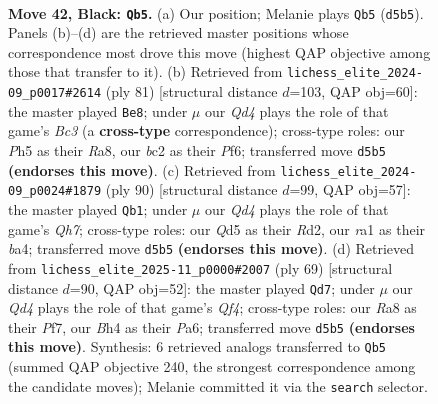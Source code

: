 \documentclass[11pt]{article}
\begin{document}
\begin{figure}[p]
\label{fig:thought-m81}
\end{figure}

\clearpage

\begin{figure}[p]\centering
\begin{subfigure}{0.46\textwidth}\centering
\resizebox{\linewidth}{!}{%
\newchessgame
\chessboard[
  setfen={r1b4k/ppp2pp1/5n2/3q3p/1B3P1b/1P2Q2P/P1B3P1/R5K1 b - - 0 42},
  showmover=false,
  pgfstyle=straightmove, color=movearrow, markmove={d5-b5}
]}
\caption{}
\end{subfigure}\hfill
\begin{subfigure}{0.46\textwidth}\centering
\resizebox{\linewidth}{!}{%
\newchessgame
\chessboard[
  setfen={r4b1k/2q3p1/2b2p1p/p3p3/P1P5/2B1P2P/2QN1PP1/R5K1 b - - 10 41},
  showmover=false,
  pgfstyle=straightmove, color=movearrow, markmove={c6-e8}
]}
\caption{}
\end{subfigure}
\\[4pt]
\begin{subfigure}{0.46\textwidth}\centering
\resizebox{\linewidth}{!}{%
\newchessgame
\chessboard[
  setfen={5r2/1q1kbp1Q/4p3/3pP3/b2B3P/p4N2/1p1R1PPK/8 w - - 0 46},
  showmover=false,
  pgfstyle=straightmove, color=movearrow, markmove={h7-b1}
]}
\caption{}
\end{subfigure}\hfill
\begin{subfigure}{0.46\textwidth}\centering
\resizebox{\linewidth}{!}{%
\newchessgame
\chessboard[
  setfen={6k1/5pp1/p4n2/P4q1p/2pP4/2NbP1PP/1r3PB1/2R1Q1K1 b - - 4 35},
  showmover=false,
  pgfstyle=straightmove, color=movearrow, markmove={f5-d7}
]}
\caption{}
\end{subfigure}
\caption{\textbf{Move 42, Black: \texttt{Qb5}.} (a) Our position; Melanie plays \texttt{Qb5} (\texttt{d5b5}). Panels (b)--(d) are the retrieved master positions whose correspondence most drove this move (highest QAP objective among those that transfer to it). (b) Retrieved from \texttt{lichess\_elite\_2024-09\_p0017\#2614} (ply 81) [structural distance $d$=103, QAP obj=60]: the master played \texttt{Be8}; under $\mu$ our \emph{Qd4} plays the role of that game's \emph{Bc3} (a \textbf{cross-type} correspondence); cross-type roles: our \emph{P}h5 as their \emph{R}a8, our \emph{b}c2 as their \emph{P}f6; transferred move \texttt{d5b5} \textbf{(endorses this move)}. (c) Retrieved from \texttt{lichess\_elite\_2024-09\_p0024\#1879} (ply 90) [structural distance $d$=99, QAP obj=57]: the master played \texttt{Qb1}; under $\mu$ our \emph{Qd4} plays the role of that game's \emph{Qh7}; cross-type roles: our \emph{Q}d5 as their \emph{R}d2, our \emph{r}a1 as their \emph{b}a4; transferred move \texttt{d5b5} \textbf{(endorses this move)}. (d) Retrieved from \texttt{lichess\_elite\_2025-11\_p0000\#2007} (ply 69) [structural distance $d$=90, QAP obj=52]: the master played \texttt{Qd7}; under $\mu$ our \emph{Qd4} plays the role of that game's \emph{Qf4}; cross-type roles: our \emph{R}a8 as their \emph{P}f7, our \emph{B}h4 as their \emph{P}a6; transferred move \texttt{d5b5} \textbf{(endorses this move)}. Synthesis: 6 retrieved analogs transferred to \texttt{Qb5} (summed QAP objective 240, the strongest correspondence among the candidate moves); Melanie committed it via the \texttt{search} selector.}

\end{figure}
\end{document}
